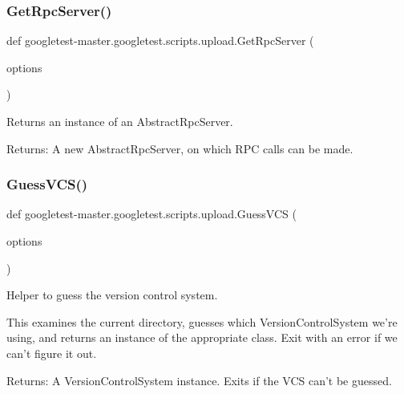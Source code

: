 \subsubsection{\texorpdfstring{GetRpcServer()}{GetRpcServer()}}
{\footnotesize\ttfamily def googletest-\/master.\+googletest.\+scripts.\+upload.\+Get\+Rpc\+Server (\begin{DoxyParamCaption}\item[{}]{options }\end{DoxyParamCaption})}

\begin{DoxyVerb}Returns an instance of an AbstractRpcServer.

Returns:
  A new AbstractRpcServer, on which RPC calls can be made.
\end{DoxyVerb}
 \mbox{\label{namespacegoogletest-master_1_1googletest_1_1scripts_1_1upload_aba73ca19bcb0382aac68d9fae8b42c18}} 
\subsubsection{\texorpdfstring{GuessVCS()}{GuessVCS()}}
{\footnotesize\ttfamily def googletest-\/master.\+googletest.\+scripts.\+upload.\+Guess\+V\+CS (\begin{DoxyParamCaption}\item[{}]{options }\end{DoxyParamCaption})}

\begin{DoxyVerb}Helper to guess the version control system.

This examines the current directory, guesses which VersionControlSystem
we're using, and returns an instance of the appropriate class.  Exit with an
error if we can't figure it out.

Returns:
  A VersionControlSystem instance. Exits if the VCS can't be guessed.
\end{DoxyVerb}
 \mbox{\label{namespacegoogletest-master_1_1googletest_1_1scripts_1_1upload_a3fb6c400f100b1cb693793f801e18928}} 

